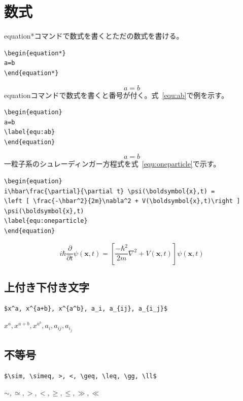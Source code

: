 \documentclass[a4j,openany,11px]{jsbook}
\begin{document}
\chapter{数式}
equation*コマンドで数式を書くとただの数式を書ける。
\begin{verbatim}
\begin{equation*}
a=b
\end{equation*}
\end{verbatim}
\begin{equation*}
a=b
\end{equation*}
equationコマンドで数式を書くと番号が付く。式~\ref{equ:ab}で例を示す。
\begin{verbatim}
\begin{equation}
a=b
\label{equ:ab}
\end{equation}
\end{verbatim}
\begin{equation}
a=b
\label{equ:ab}
\end{equation}
一粒子系のシュレーディンガー方程式を式~\ref{equ:oneparticle}で示す。
\begin{verbatim}
\begin{equation}
i\hbar\frac{\partial}{\partial t} \psi(\boldsymbol{x},t) = 
\left [ \frac{-\hbar^2}{2m}\nabla^2 + V(\boldsymbol{x},t)\right ] \psi(\boldsymbol{x},t)
\label{equ:oneparticle}
\end{equation}
\end{verbatim}
\begin{equation}
i\hbar\frac{\partial}{\partial t} \psi(\boldsymbol{x},t) = 
\left [ \frac{-\hbar^2}{2m}\nabla^2 + V(\boldsymbol{x},t)\right ] \psi(\boldsymbol{x},t)
\label{equ:oneparticle}
\end{equation}

\section{上付き下付き文字}
\begin{verbatim}
$x^a, x^{a+b}, x^{a^b}, a_i, a_{ij}, a_{i_j}$
\end{verbatim}
$x^a, x^{a+b}, x^{a^b}, a_i, a_{ij}, a_{i_j}$

\section{不等号}
\begin{verbatim}
$\sim, \simeq, >, <, \geq, \leq, \gg, \ll$
\end{verbatim}
$\sim, \simeq, >, <, \geq, \leq, \gg, \ll$
\end{document}
